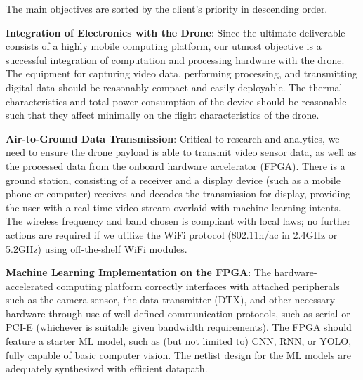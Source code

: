 The main objectives are sorted by the client's priority in descending order.

\textbf{Integration of Electronics with the Drone}:
Since the ultimate deliverable consists of a highly mobile computing platform,
our utmost objective is a successful integration of computation and processing hardware with the drone.
The equipment for capturing video data, performing processing, and transmitting digital data should be reasonably compact and easily deployable.
The thermal characteristics and total power consumption of the device should be reasonable such that they affect minimally
on the flight characteristics of the drone.

\textbf{Air-to-Ground Data Transmission}:
Critical to research and analytics, we need to ensure the drone payload is able to transmit video sensor data, as well as the processed data
from the onboard hardware accelerator (FPGA). There is a ground station, consisting of a receiver and a display device (such as a mobile phone or 
computer) receives and decodes the transmission for display, providing the user with a real-time video stream overlaid with machine learning intents.
The wireless frequency and band chosen is compliant with local laws; no further actions are required if we utilize the WiFi protocol (802.11n/ac in 2.4GHz or 5.2GHz)
using off-the-shelf WiFi modules.

\textbf{Machine Learning Implementation on the FPGA}:
The hardware-accelerated computing platform correctly interfaces with attached peripherals such as the camera sensor, the data transmitter (DTX), and other necessary hardware
through use of well-defined communication protocols, such as serial or PCI-E (whichever is suitable given bandwidth requirements). 
The FPGA should feature a starter ML model, such as (but not limited to) CNN, RNN, or YOLO, fully capable of basic computer vision.
The netlist design for the ML models are adequately synthesized with efficient datapath.
